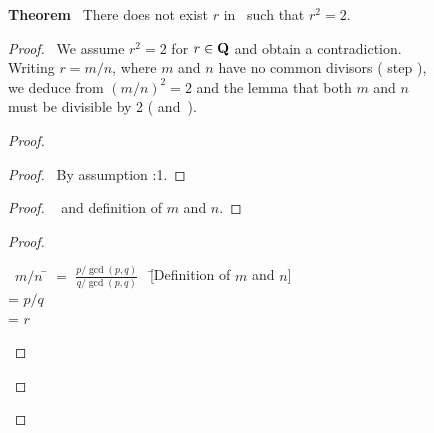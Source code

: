 \begin{figure}[p]
\small
{\bf Theorem} \ There does not exist $r$ in \Q\ such that $r^{2}=2$.
\begin{proof}
\pfsketch\ We assume $r^{2}=2$ for $r\in{\bf Q}$ and obtain a contradiction.
Writing $r=m/n$, where $m$ and $n$ have no common divisors (%
 step 
),
we deduce from $(m/n)^{2}=2$  and the lemma that both $m$ and $n$
must be divisible by 2 (%
 and~).
\begin{proof}
  \begin{proof}
    \pf\ By assumption :1.
  \end{proof}


  \begin{proof}
    \pf\  and definition of $m$ and $n$.
  \end{proof}

   \begin{proof}
    \begin{tabbing}
      \pf\ $m/n$ \= $=$ $\displaystyle\frac{p/\gcd(p,q)}{q/\gcd(p,q)}$ \ 
                                        \= [Definition of $m$ and $n$]\\
                        \> = $p/q$ \> [Simple algebra]\\
                        \> = $r$  \> [By \stepref{1.1}]
    \end{tabbing}
   \end{proof} %


\end{proof}
\end{proof}
\end{figure}
